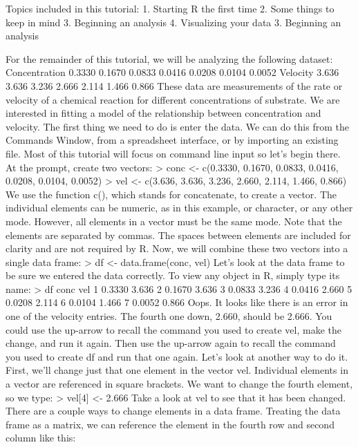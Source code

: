 \documentclass[a4paper,12pt]{article}
\begin{document}
Topics included in this tutorial: 
1. Starting R the first time
2. Some things to keep in mind
3. Beginning an analysis
4. Visualizing your data
3. Beginning an analysis


For the remainder of this tutorial, we will be analyzing the following dataset: 
Concentration
0.3330
0.1670
0.0833
0.0416
0.0208
0.0104
0.0052
Velocity
3.636
3.636
3.236
2.666
2.114
1.466
0.866
These data are measurements of the rate or velocity of a chemical reaction for different concentrations of substrate. We are interested in fitting a model of the relationship between concentration and velocity. The first thing we need to do is enter the data. We can do this from the Commands Window, from a spreadsheet interface, or by importing an existing file. Most of this tutorial will focus on command line input so let's begin there. At the prompt, create two vectors: 
> conc <- c(0.3330, 0.1670, 0.0833, 0.0416, 0.0208, 0.0104, 0.0052)
> vel <- c(3.636, 3.636, 3.236, 2.660, 2.114, 1.466, 0.866)
We use the function c(), which stands for concatenate, to create a vector. The individual elements can be numeric, as in this example, or character, or any other mode. However, all elements in a vector must be the same mode. Note that the elements are separated by commas. The spaces between elements are included for clarity and are not required by R. 
Now, we will combine these two vectors into a single data frame: 
> df <- data.frame(conc, vel)
Let's look at the data frame to be sure we entered the data correctly. To view any object in R, simply type its name: 
> df
conc   vel
1 0.3330 3.636
2 0.1670 3.636
3 0.0833 3.236
4 0.0416 2.660
5 0.0208 2.114
6 0.0104 1.466
7 0.0052 0.866
Oops. It looks like there is an error in one of the velocity entries. The fourth one down, 2.660, should be 2.666. You could use the up-arrow to recall the command you used to create vel, make the change, and run it again. Then use the up-arrow again to recall the command you used to create df and run that one again. Let's look at another way to do it. First, we'll change just that one element in the vector vel. Individual elements in a vector are referenced in square brackets. We want to change the fourth element, so we type: 
> vel[4] <- 2.666
Take a look at vel to see that it has been changed. There are a couple ways to change elements in a data frame. Treating the data frame as a matrix, we can reference the element in the fourth row and second column like this: 
\end{document}
